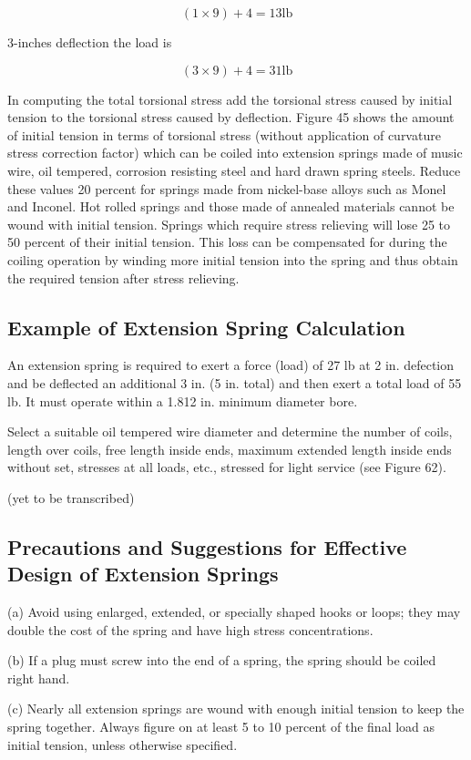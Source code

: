 \documentclass[10pt]{article}
\begin{document}
$$(1 \times 9) + 4 = 13 \mathrm{lb}$$

3-inches deflection the load is

$$(3 \times 9) + 4 = 31 \mathrm{lb}$$

In computing the total torsional stress add the torsional stress caused by initial tension to the torsional stress caused by deflection.
Figure 45 shows the amount of initial tension in terms of torsional stress (without application of curvature stress correction factor) which can be coiled into extension springs made of music wire, oil tempered, corrosion resisting steel and hard drawn spring steels.
Reduce these values 20 percent for springs made from nickel-base alloys such as Monel and Inconel. Hot rolled springs and those made of annealed materials cannot be wound with initial tension.
Springs which require stress relieving will lose 25 to 50 percent of their initial tension.
This loss can be compensated for during the coiling operation by winding more initial tension into the spring and thus obtain the required tension after stress relieving.

\subsection{Example of Extension Spring Calculation} %
An extension spring is required to exert a force (load)  of 27 lb at 2 in. defection and be deflected an additional 3 in. (5 in. total) and then exert a total load of 55 lb. 
It must operate within a 1.812 in. minimum diameter bore.

Select a suitable oil tempered wire diameter and determine the number of coils, length over coils, free length inside ends, maximum extended length inside ends without set, stresses at all loads, etc., stressed for light service (see Figure 62).

(yet to be transcribed)

\subsection{Precautions and Suggestions for Effective Design of Extension Springs} %
(a) Avoid using enlarged, extended, or specially shaped hooks or loops; they may double the cost of the spring and have high stress concentrations.

(b) If a plug must screw into the end of a spring, the spring should be coiled right hand.

(c) Nearly all extension springs are wound with enough initial tension to keep the spring together. Always figure on at least 5 to 10 percent of the final load as initial tension, unless otherwise specified.
\end{document}
